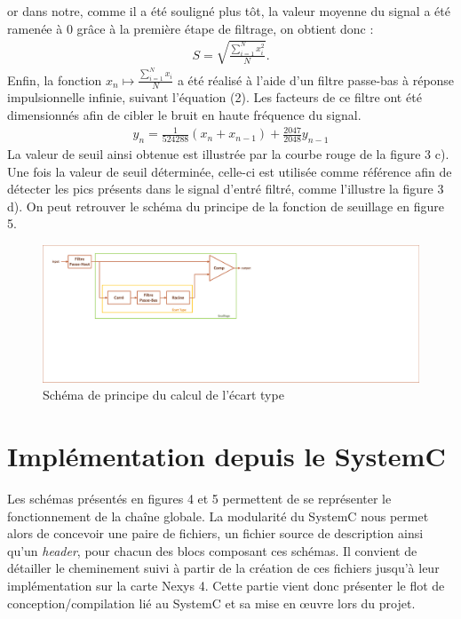 \documentclass[a4paper,12pt]{article}
\begin{document}
\begin{itemize}
\begin{itemize}
or dans notre, comme il a été souligné plus tôt, la valeur moyenne du signal a été ramenée à 0 grâce à la première étape de filtrage, on obtient donc :
\begin{eqnarray*}
S = \sqrt{\frac{\sum^N_{i=1}x_i^2}{N}}.
\end{eqnarray*}
Enfin, la fonction $x_n\mapsto\frac{\sum^N_{i=1}x_i}{N}$ a été réalisé à l'aide d'un filtre passe-bas à réponse impulsionnelle infinie, suivant l'équation (2). Les facteurs de ce filtre ont été dimensionnés afin de cibler le bruit en haute fréquence du signal.
\begin{eqnarray}
y_n = \frac{1}{524288}\left(x_n + x_{n-1}\right) + \frac{2047}{2048}y_{n-1}
\end{eqnarray}
La valeur de seuil ainsi obtenue est illustrée par la courbe rouge de la figure 3 c). Une fois la valeur de seuil déterminée, celle-ci est utilisée comme référence afin de détecter les pics présents dans le signal d'entré filtré, comme
 l'illustre la figure 3 d). On peut retrouver le schéma du principe de la fonction de seuillage en figure 5.
\begin{figure}[H]
\centering
\includegraphics[width=\textwidth, keepaspectratio]{chainXavier.pdf}
\caption{Schéma de principe du calcul de l'écart type}
\end{figure}
\end{itemize}
\end{itemize}
\newpage
\section{Implémentation depuis le SystemC}
Les schémas présentés en figures 4 et 5 permettent de se représenter le fonctionnement de la chaîne globale. La modularité du SystemC nous permet alors de concevoir une paire de fichiers, un fichier source de description ainsi qu'un \textit{header}, pour chacun des blocs composant ces schémas. Il convient de détailler le cheminement suivi à partir de la création de ces fichiers jusqu'à leur implémentation sur la carte Nexys 4. Cette partie vient donc présenter le flot de conception/compilation lié au SystemC et sa mise en œuvre lors du projet.
\end{document}
